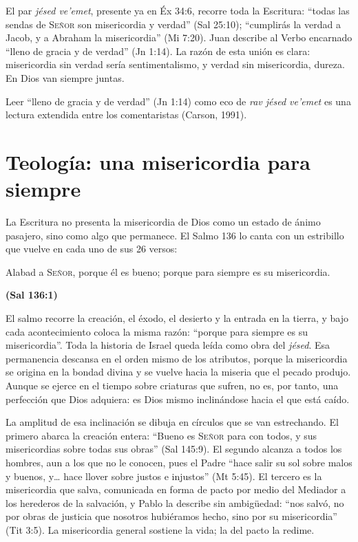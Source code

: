 \documentclass[11pt,letterpaper]{article}
\newcommand{\SENOR}{\textsc{Señor}}
\newcommand{\fuente}[1]{\par\hfill{\upshape\bfseries\small\textcolor{azul}{#1}}}
\begin{document}
El par \emph{jésed ve'emet}, presente ya en Éx 34:6, recorre toda la Escritura: ``todas las sendas de \SENOR{} son misericordia y verdad'' (Sal 25:10); ``cumplirás la verdad a Jacob, y a Abraham la misericordia'' (Mi 7:20). Juan describe al Verbo encarnado ``lleno de gracia y de verdad'' (Jn 1:14). La razón de esta unión es clara: misericordia sin verdad sería sentimentalismo, y verdad sin misericordia, dureza. En Dios van siempre juntas.

\begin{nota}[Precisión]
Leer ``lleno de gracia y de verdad'' (Jn 1:14) como eco de \emph{rav jésed ve'emet} es una lectura extendida entre los comentaristas (Carson, 1991).
\end{nota}

\section{Teología: una misericordia para siempre}

La Escritura no presenta la misericordia de Dios como un estado de ánimo pasajero, sino como algo que permanece. El Salmo 136 lo canta con un estribillo que vuelve en cada uno de sus 26 versos:

\begin{cita}Alabad a \SENOR, porque él es bueno; porque para siempre es su misericordia.\fuente{(Sal 136:1)}\end{cita}

El salmo recorre la creación, el éxodo, el desierto y la entrada en la tierra, y bajo cada acontecimiento coloca la misma razón: ``porque para siempre es su misericordia''. Toda la historia de Israel queda leída como obra del \emph{jésed}. Esa permanencia descansa en el orden mismo de los atributos, porque la misericordia se origina en la bondad divina y se vuelve hacia la miseria que el pecado produjo. Aunque se ejerce en el tiempo sobre criaturas que sufren, no es, por tanto, una perfección que Dios adquiera: es Dios mismo inclinándose hacia el que está caído.

La amplitud de esa inclinación se dibuja en círculos que se van estrechando. El primero abarca la creación entera: ``Bueno es \SENOR{} para con todos, y sus misericordias sobre todas sus obras'' (Sal 145:9). El segundo alcanza a todos los hombres, aun a los que no le conocen, pues el Padre ``hace salir su sol sobre malos y buenos, y\ldots{} hace llover sobre justos e injustos'' (Mt 5:45). El tercero es la misericordia que salva, comunicada en forma de pacto por medio del Mediador a los herederos de la salvación, y Pablo la describe sin ambigüedad: ``nos salvó, no por obras de justicia que nosotros hubiéramos hecho, sino por su misericordia'' (Tit 3:5). La misericordia general sostiene la vida; la del pacto la redime.
\end{document}
